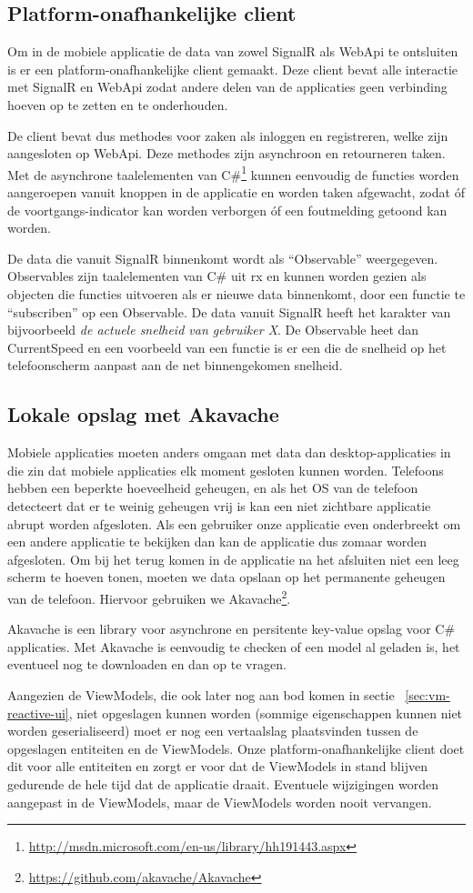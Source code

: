 \subsection{Platform-onafhankelijke client}
Om in de mobiele applicatie de data van zowel SignalR als WebApi te ontsluiten is er een platform-onafhankelijke client gemaakt. Deze client bevat alle interactie met SignalR en WebApi zodat andere delen van de applicaties geen verbinding hoeven op te zetten en te onderhouden.

De client bevat dus methodes voor zaken als inloggen en registreren, welke zijn aangesloten op WebApi. Deze methodes zijn asynchroon en retourneren taken. Met de asynchrone taalelementen van C\#\footnote{\url{http://msdn.microsoft.com/en-us/library/hh191443.aspx}} kunnen eenvoudig de functies worden aangeroepen vanuit knoppen in de applicatie en worden taken afgewacht, zodat óf de voortgangs-indicator kan worden verborgen óf een foutmelding getoond kan worden.

De data die vanuit SignalR binnenkomt wordt als ``Observable'' weergegeven. Observables zijn taalelementen van C\# uit \ac{rx} en kunnen worden gezien als objecten die functies uitvoeren als er nieuwe data binnenkomt, door een functie te ``subscriben'' op een Observable. De data vanuit SignalR heeft het karakter van bijvoorbeeld \textit{de actuele snelheid van gebruiker X}. De Observable heet dan CurrentSpeed en een voorbeeld van een functie is er een die de snelheid op het telefoonscherm aanpast aan de net binnengekomen snelheid.

\subsection{Lokale opslag met Akavache}
Mobiele applicaties moeten anders omgaan met data dan desktop-applicaties in die zin dat mobiele applicaties elk moment gesloten kunnen worden. Telefoons hebben een beperkte hoeveelheid geheugen, en als het OS van de telefoon detecteert dat er te weinig geheugen vrij is kan een niet zichtbare applicatie abrupt worden afgesloten. Als een gebruiker onze applicatie even onderbreekt om een andere applicatie te bekijken dan kan de applicatie dus zomaar worden afgesloten. Om bij het terug komen in de applicatie na het afsluiten niet een leeg scherm te hoeven tonen, moeten we data opslaan op het permanente geheugen van de telefoon. Hiervoor gebruiken we Akavache\footnote{\url{https://github.com/akavache/Akavache}}.

Akavache is een library voor asynchrone en persitente key-value opslag voor C\# applicaties. Met Akavache is eenvoudig te checken of een model al geladen is, het eventueel nog te downloaden en dan op te vragen. 

Aangezien de ViewModels, die ook later nog aan bod komen in sectie ~\ref{sec:vm-reactive-ui}, niet opgeslagen kunnen worden (sommige eigenschappen kunnen niet worden geserialiseerd) moet er nog een vertaalslag plaatsvinden tussen de opgeslagen entiteiten en de ViewModels. Onze platform-onafhankelijke client doet dit voor alle entiteiten en zorgt er voor dat  de ViewModels in stand blijven gedurende de hele tijd dat de applicatie draait. Eventuele wijzigingen worden aangepast in de ViewModels, maar de ViewModels worden nooit vervangen.